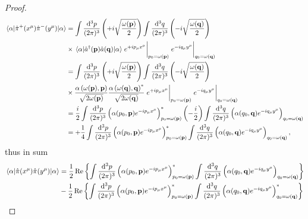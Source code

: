 \begin{proof}
\begin{equation*}
\begin{split}
			\expval{\hat\pi^+(x^\mu)\hat\pi^-(y^\mu)}{\alpha}
			&=
			\int\frac{\dd[3]{p}}{(2\pi)^3}
			\left(
				+i
				\sqrt{\frac{\omega(\vb{p})}{2}}
			\right)
			\int\frac{\dd[3]{q}}{(2\pi)^3}
			\left(
				-i
				\sqrt{\frac{\omega(\vb{q})}{2}}
			\right)
			\\
			&\times
			\expval{\hat{a}^\dagger(\vb{p})\hat{a}(\vb{q})}{\alpha}
			\eval{e^{+ip_\mu x^\mu}}_{p_0=\omega(\vb{p})}
			\eval{e^{-iq_\mu y^\mu}}_{q_0=\omega(\vb{q})}
			\\
			&=
			\int\frac{\dd[3]{p}}{(2\pi)^3}
			\left(
				+i
				\sqrt{\frac{\omega(\vb{p})}{2}}
			\right)
			\int\frac{\dd[3]{q}}{(2\pi)^3}
			\left(
				-i
				\sqrt{\frac{\omega(\vb{q})}{2}}
			\right)
			\\
			&\times
			\frac{\alpha\left(\omega(\vb{p}),\vb{p}\right)}{\sqrt{2\omega(\vb{p})}}
			\frac{\alpha\left(\omega(\vb{q}),\vb{q}\right)^*}{\sqrt{2\omega(\vb{q})}}
			\eval{e^{+ip_\mu x^\mu}}_{p_0=\omega(\vb{p})}
			\eval{e^{-iq_\mu y^\mu}}_{q_0=\omega(\vb{q})}
			\\
			&=
			\frac{i}{2}
			\int\frac{\dd[3]{p}}{(2\pi)^3}
			\left(
				\alpha(p_0,\vb{p})
				e^{-ip_\mu x^\mu}
			\right)^*_{p_0=\omega(\vb{p})}
			\left(
				-
				\frac{i}{2}
			\right)
			\int\frac{\dd[3]{q}}{(2\pi)^3}
			\left(
				\alpha(q_0,\vb{q})
				e^{-iq_\mu y^\mu}
			\right)_{q_0=\omega(\vb{q})}
			\\
			&=
			+
			\frac{1}{4}
			\int\frac{\dd[3]{p}}{(2\pi)^3}
			\left(
				\alpha(p_0,\vb{p})
				e^{-ip_\mu x^\mu}
			\right)^*_{p_0=\omega(\vb{p})}
			\int\frac{\dd[3]{q}}{(2\pi)^3}
			\left(
				\alpha(q_0,\vb{q})
				e^{-iq_\mu y^\mu}
			\right)_{q_0=\omega(\vb{q})}
			,
		\end{split}
	\end{equation*}
	thus in sum
	\begin{equation*}
		\begin{split}
			\expval{\hat\pi(x^\mu)\hat\pi(y^\mu)}{\alpha}
			&=
			\frac{1}{2}
			\operatorname{\operatorname{Re}}\left\{
				\int\frac{\dd[3]{p}}{(2\pi)^3}
				\left(
					\alpha(p_0,\vb{p})
					e^{-ip_\mu x^\mu}
				\right)^*_{p_0=\omega(\vb{p})}
				\int\frac{\dd[3]{q}}{(2\pi)^3}
				\left(
					\alpha(q_0,\vb{q})
					e^{-iq_\mu y^\mu}
				\right)_{q_0=\omega(\vb{q})}			
			\right\}
			\\
			&-
			\frac{1}{2}
			\operatorname{\operatorname{Re}}\left\{
				\int\frac{\dd[3]{p}}{(2\pi)^3}
				\left(
					\alpha(p_0,\vb{p})
					e^{-ip_\mu x^\mu}
				\right)^*_{p_0=\omega(\vb{p})}
				\int\frac{\dd[3]{q}}{(2\pi)^3}
				\left(
					\alpha(q_0,\vb{q})
					e^{-iq_\mu y^\mu}
				\right)^*_{q_0=\omega(\vb{q})}
			\right\}
		\end{split}
	\end{equation*}
\end{proof}

